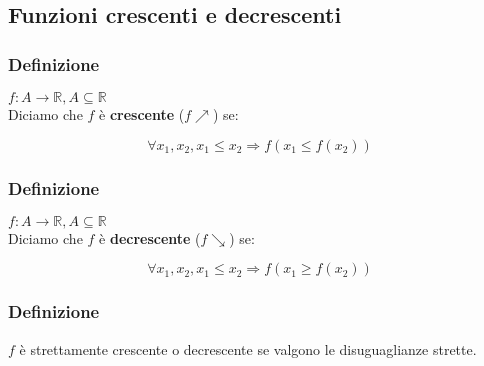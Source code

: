 \subsection{Funzioni crescenti e decrescenti}
\subsubsection*{Definizione}
$f:A\rightarrow \mathbb{R}, A \subseteq \mathbb{R}$ \\
Diciamo che $f$ è \textbf{crescente} ($f \nearrow$) se:
\begin{Large}
    \[
        \forall x_{1},x_{2}, x_{1}\leq x_{2} \Rightarrow f(x_{1}\leq f(x_{2}))
    \]
\end{Large}
\subsubsection*{Definizione}
$f:A \rightarrow \mathbb{R}, A \subseteq \mathbb{R}$ \\
Diciamo che $f$ è \textbf{decrescente} ($f \searrow$) se:
\begin{Large}
    \[
        \forall x_{1},x_{2}, x_{1}\leq x_{2} \Rightarrow f(x_{1}\geq f(x_{2}))    
    \]
\end{Large}
\subsubsection*{Definizione}
$f$ è strettamente crescente o decrescente se valgono le disuguaglianze strette.
